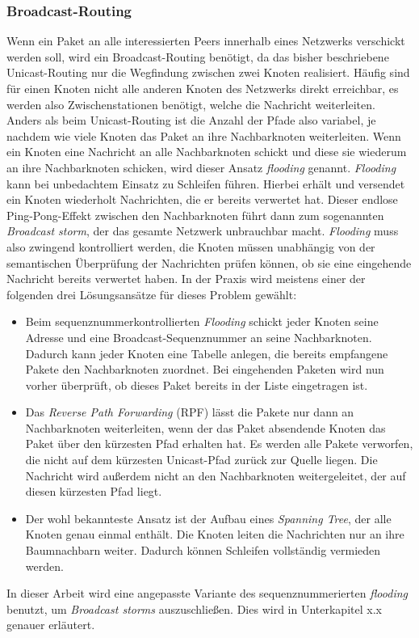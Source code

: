 \subsubsection{Broadcast-Routing}
Wenn ein Paket an alle interessierten Peers innerhalb eines Netzwerks verschickt werden soll, wird ein Broadcast-Routing benötigt, da das bisher beschriebene Unicast-Routing nur die Wegfindung zwischen zwei Knoten realisiert. Häufig sind für einen Knoten nicht alle anderen Knoten des Netzwerks direkt erreichbar, es werden also Zwischenstationen benötigt, welche die Nachricht weiterleiten. Anders als beim Unicast-Routing ist die Anzahl der Pfade also variabel, je nachdem wie viele Knoten das Paket an ihre Nachbarknoten weiterleiten. Wenn ein Knoten eine Nachricht an alle Nachbarknoten schickt und diese sie wiederum an ihre Nachbarknoten schicken, wird dieser Ansatz \textit{flooding} genannt. \textit{Flooding} kann bei unbedachtem Einsatz zu Schleifen führen. Hierbei erhält und versendet ein Knoten wiederholt Nachrichten, die er bereits verwertet hat. Dieser endlose Ping-Pong-Effekt zwischen den Nachbarknoten führt dann zum sogenannten \textit{Broadcast storm}, der das gesamte Netzwerk unbrauchbar macht. \textit{Flooding} muss also zwingend kontrolliert werden, die Knoten müssen unabhängig von der semantischen Überprüfung der Nachrichten prüfen können, ob sie eine eingehende Nachricht bereits verwertet haben. In der Praxis wird meistens einer der folgenden drei Lösungsansätze für dieses Problem gewählt:
\begin{itemize}
	\item Beim sequenznummerkontrollierten \textit{Flooding} schickt jeder Knoten seine Adresse und eine Broadcast-Sequenznummer an seine Nachbarknoten. Dadurch kann jeder Knoten eine Tabelle anlegen, die bereits empfangene Pakete den Nachbarknoten zuordnet. Bei eingehenden Paketen wird nun vorher überprüft, ob dieses Paket bereits in der Liste eingetragen ist. 
	\item Das \textit{Reverse Path Forwarding} (RPF) lässt die Pakete nur dann an Nachbarknoten weiterleiten, wenn der das Paket absendende Knoten das Paket über den kürzesten Pfad erhalten hat. Es werden alle Pakete verworfen, die nicht auf dem kürzesten Unicast-Pfad zurück zur Quelle liegen. Die Nachricht wird außerdem nicht an den Nachbarknoten weitergeleitet, der auf diesen kürzesten Pfad liegt. 
	\item Der wohl bekannteste Ansatz ist der Aufbau eines \textit{Spanning Tree}, der alle Knoten genau einmal enthält. Die Knoten leiten die Nachrichten nur an ihre Baumnachbarn weiter. Dadurch können Schleifen vollständig vermieden werden.
\end{itemize}
In dieser Arbeit wird eine angepasste Variante des sequenznummerierten \textit{flooding} benutzt, um \textit{Broadcast storms} auszuschließen. Dies wird in Unterkapitel x.x genauer erläutert.

